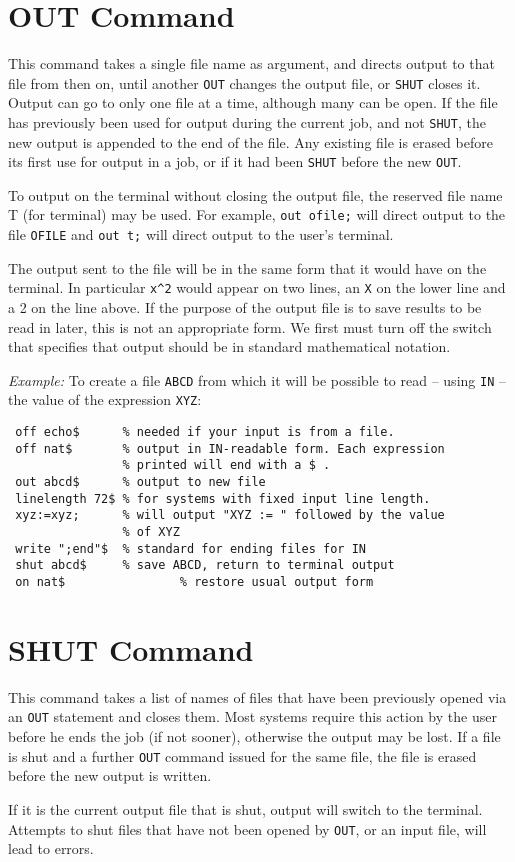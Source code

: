 \section{OUT Command}
\hypertarget{command:OUT}{}
This command takes a single file name as argument, and directs output to
that file from then on, until another \texttt{OUT} changes the output file,
or \texttt{SHUT} closes it.  Output can go to only one file at a time,
although many can be open.  If the file has previously been used for
output during the current job, and not \texttt{SHUT}, the new
output is appended to the end of the file.  Any existing file is erased
before its first use for output in a job, or if it had been \texttt{SHUT}
before the new \texttt{OUT}.

To output on the terminal without closing the output file, the reserved
file name T (for terminal) may be used.  For example,
\texttt{out ofile;} will direct output to the file \texttt{OFILE} and
\texttt{out t;} will direct output to the user's terminal.

The output sent to the file will be in the same form that it would have on
the terminal.  In particular \texttt{x\textasciicircum 2} would appear 
on two lines, an
\texttt{X} on the lower line and a 2 on the line above.  If the purpose of the
output file is to save results to be read in later, this is not an
appropriate form.  We first must turn off the  switch that
specifies that output should be in standard mathematical notation.

\textit{Example:} To create a file \texttt{ABCD} from which it will be possible
to read -- using \texttt{IN} -- the value of the expression \texttt{XYZ}:
\begin{verbatim}
 off echo$      % needed if your input is from a file.
 off nat$       % output in IN-readable form. Each expression
                % printed will end with a $ .
 out abcd$      % output to new file
 linelength 72$ % for systems with fixed input line length.
 xyz:=xyz;      % will output "XYZ := " followed by the value
                % of XYZ
 write ";end"$  % standard for ending files for IN
 shut abcd$     % save ABCD, return to terminal output
 on nat$                % restore usual output form
\end{verbatim}

\section{SHUT Command}
\hypertarget{command:SHUT}{}
This command takes a list of names of files that have been previously
opened via an \texttt{OUT} statement and closes them. Most systems require this
action by the user before he ends the {\REDUCE} job (if not sooner),
otherwise the output may be lost. If a file is shut and a further \texttt{OUT}
command issued for the same file, the file is erased before the new output
is written.

If it is the current output file that is shut, output will switch to the
terminal.  Attempts to shut files that have not been opened by \texttt{OUT},
or an input file, will lead to errors.

